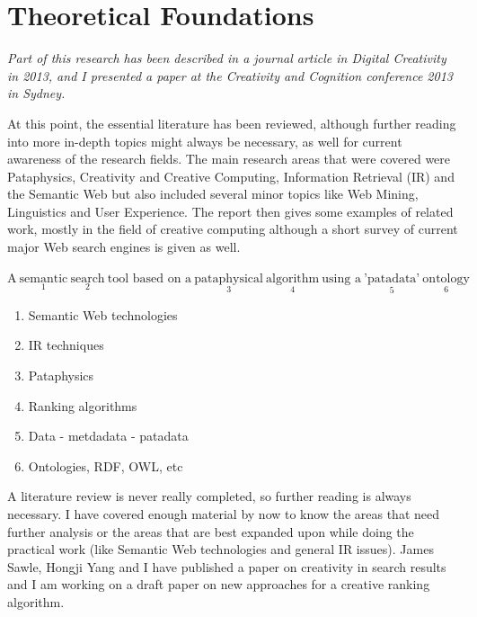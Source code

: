 
\chapter{Theoretical Foundations}
\label{ch:theoretical}

\emph{Part of this research has been described in a journal article in Digital Creativity in 2013, and I presented a paper at the Creativity and Cognition conference 2013 in Sydney.}

\grule

At this point, the essential literature has been reviewed, although further reading into more in-depth topics might always be necessary, as well for current awareness of the research fields. The main research areas that were covered were Pataphysics, Creativity and Creative Computing, Information Retrieval (IR) and the Semantic Web but also included several minor topics like Web Mining, Linguistics and User Experience. The report then gives some examples of related work, mostly in the field of creative computing although a short survey of current major Web search engines is given as well.

$\text{A} \ \underset{1}{\text{semantic}} \ \underset{2}{\text{search}} \ \text{tool based on a} \ \underset{3}{\text{pataphysical}} \ \underset{4}{\text{algorithm}} \ \text{using a} \ \underset{5}{\text{'patadata'}} \ \underset{6}{\text{ontology}}$

\begin{enumerate}
  \item Semantic Web technologies
  \item IR techniques
  \item Pataphysics
  \item Ranking algorithms
  \item Data - metdadata - patadata
  \item Ontologies, RDF, OWL, etc
\end{enumerate}

A literature review is never really completed, so further reading is always necessary. I have covered enough material by now to know the areas that need further analysis or the areas that are best expanded upon while doing the practical work (like Semantic Web technologies and general IR issues). James Sawle, Hongji Yang and I have published a paper on creativity in search results and I am working on a draft paper on new approaches for a creative ranking algorithm.

